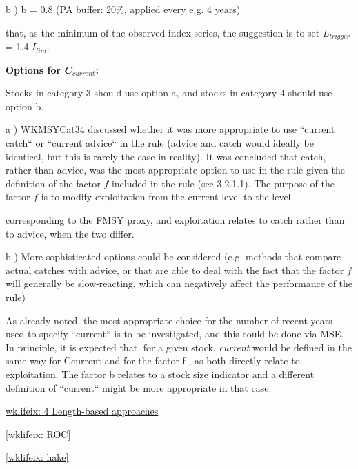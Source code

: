  
b )  b = 0.8 (PA buffer: 20\%, applied every e.g. 4 years) 

that, as the minimum of the observed index series, the suggestion is to set $L_{trigger}$ = 1.4 $I_{lim}$. 

\textbf{Options for $𝑪_{current}$:}

Stocks in category 3 should use option a, and stocks in category 4 should use option b. 

a )  WKMSYCat34 discussed whether it was more appropriate to use “current catch“ or “current advice“ in the rule (advice and catch would ideally be identical, but this is rarely the case in reality). It was concluded that catch, rather than advice, was the most appropriate option to use in the rule given the definition of the factor $f$ included in the rule (see 3.2.1.1). The purpose of the factor $f$ is to modify exploitation from the current level to the level 

corresponding to the FMSY proxy, and exploitation relates to catch rather than to advice, when the two differ. 

b )  More sophisticated options could be considered (e.g. methods that compare actual catches with advice, or that are able to deal with the fact that the factor $f$ will  generally  be  slow-reacting,  which  can  negatively  affect  the  performance of the rule) 

As already noted, the most appropriate choice for the number of recent years used to specify “current“ is to be investigated, and this could be done via MSE. In principle, it is expected that, for a given stock, \textit{current} would be defined in the same way for Ccurrent and for the factor f , as both directly relate to exploitation. The factor b relates to a stock size indicator and a different definition of “current“ might be more appropriate in that case.  


\href{http://ices.dk/sites/pub/Publication Reports/Expert Group Report/Fisheries Resources Steering Group/2019/WKLIFEIX/WKLIFE_IX_2019.pdf#page=30}{wklifeix: 4 Length-based approaches}

\href{http://ices.dk/sites/pub/Publication Reports/Expert Group Report/Fisheries Resources Steering Group/2019/WKLIFEIX/WKLIFE_IX_2019.pdf#page=58}{[wklifeix: ROC]}

\href{http://ices.dk/sites/pub/Publication Reports/Expert Group Report/Fisheries Resources Steering Group/2019/WKLIFEIX/WKLIFE_IX_2019.pdf#page=100}{[wklifeix: hake]}


